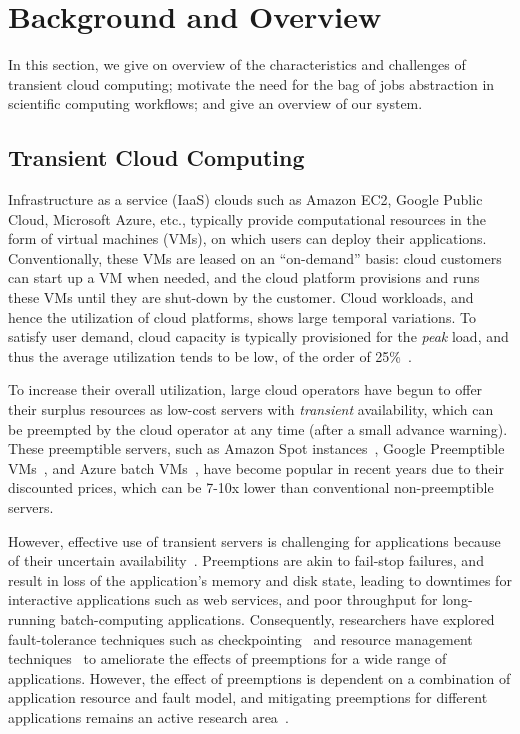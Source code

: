 \section{Background and Overview}

In this section, we give on overview of the characteristics and challenges of transient cloud computing; motivate the need for the bag of jobs abstraction in scientific computing workflows; and give an overview of our \sysname system. 


\subsection{Transient Cloud Computing}

Infrastructure as a service (IaaS) clouds such as Amazon EC2, Google Public Cloud, Microsoft Azure, etc., typically provide computational resources in the form of virtual machines (VMs), on which users can deploy their applications.
Conventionally, these VMs are leased on an ``on-demand'' basis: cloud customers can start up a VM when needed, and the cloud platform provisions and runs these VMs until they are shut-down by the customer. 
Cloud workloads, and hence the utilization of cloud platforms, shows large temporal variations.  
To satisfy user demand, cloud capacity is typically provisioned for the \emph{peak} load, and thus the average utilization tends to be low, of the order of 25\%~\cite{borg,resource-central-sosp17}. 


To increase their overall utilization, large cloud operators have begun to offer their surplus resources as low-cost servers with \emph{transient} availability, which can be preempted by the cloud operator at any time (after a small advance warning). 
These preemptible servers, such as Amazon Spot instances~\cite{spot-web}, Google Preemptible VMs~\cite{preemptible}, and Azure batch VMs~\cite{azure-batch}, have become popular in recent years due to their discounted prices, which can be 7-10x lower than conventional non-preemptible servers. 


However, effective use of transient servers is challenging for applications because of their uncertain availability~\cite{spotcheck, prateek-thesis}. 
Preemptions are akin to fail-stop failures, and result in loss of the application's memory and disk state, leading to downtimes for interactive applications such as web services, and poor throughput for long-running batch-computing applications. 
Consequently, researchers have explored fault-tolerance techniques such as checkpointing~\cite{flint, marathe2014exploiting, spoton} and resource management techniques~\cite{exosphere} to ameliorate the effects of preemptions for a wide range of applications. 
However, the effect of preemptions is dependent on a combination of application resource and fault model, and mitigating preemptions for different applications remains an active research area~\cite{hourglass-eurosys19}. 




